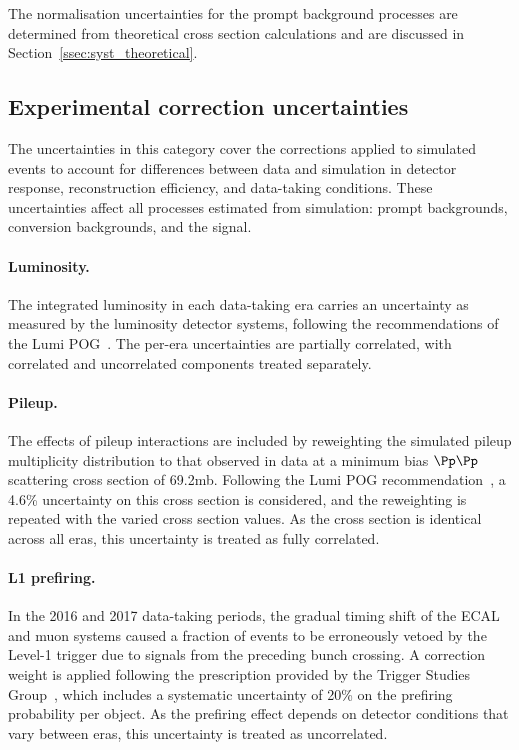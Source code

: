 The normalisation uncertainties for the prompt background processes are determined from theoretical cross section calculations and are discussed in Section~\ref{ssec:syst_theoretical}.

\subsection{Experimental correction uncertainties}
\label{ssec:syst_experimental}

The uncertainties in this category cover the corrections applied to simulated events to account for differences between data and simulation in detector response, reconstruction efficiency, and data-taking conditions. These uncertainties affect all processes estimated from simulation: prompt backgrounds, conversion backgrounds, and the signal.

\paragraph{Luminosity.}
The integrated luminosity in each data-taking era carries an uncertainty as measured by the luminosity detector systems, following the recommendations of the Lumi POG~\cite{LumiRecommendationsRun2,LumiRecommendationsRun3}. The per-era uncertainties are partially correlated, with correlated and uncorrelated components treated separately.

\paragraph{Pileup.}
The effects of pileup interactions are included by reweighting the simulated pileup multiplicity distribution to that observed in data at a minimum bias $\Pp\Pp$ scattering cross section of 69.2\unit{mb}. Following the Lumi POG recommendation~\cite{LumiPOG_PU}, a 4.6\% uncertainty on this cross section is considered, and the reweighting is repeated with the varied cross section values. As the cross section is identical across all eras, this uncertainty is treated as fully correlated.

\paragraph{L1 prefiring.}
In the 2016 and 2017 data-taking periods, the gradual timing shift of the ECAL and muon systems caused a fraction of events to be erroneously vetoed by the Level-1 trigger due to signals from the preceding bunch crossing. A correction weight is applied following the prescription provided by the Trigger Studies Group~\cite{L1Prefire}, which includes a systematic uncertainty of 20\% on the prefiring probability per object. As the prefiring effect depends on detector conditions that vary between eras, this uncertainty is treated as uncorrelated.

